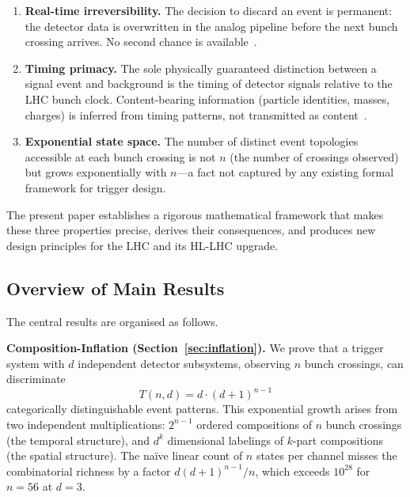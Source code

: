 \documentclass[twocolumn,10pt,a4paper]{article}
\theoremstyle{thmstyle}
\theoremstyle{definition}
\theoremstyle{remark}
\begin{document}
\begin{enumerate}[leftmargin=1.5em,itemsep=0.2em]
\item \textbf{Real-time irreversibility.} The decision to discard an
event is permanent: the detector data is overwritten in the analog
pipeline before the next bunch crossing arrives. No second chance is
available~\citep{atlas_hlt2003,cms_trigger2002}.

\item \textbf{Timing primacy.} The sole physically guaranteed
distinction between a signal event and background is the timing of
detector signals relative to the LHC bunch clock. Content-bearing
information (particle identities, masses, charges) is inferred from
timing patterns, not transmitted as content~\citep{leo1994techniques}.

\item \textbf{Exponential state space.} The number of distinct event
topologies accessible at each bunch crossing is not $n$ (the number
of crossings observed) but grows exponentially with $n$---a fact
not captured by any existing formal framework for trigger design.
\end{enumerate}

The present paper establishes a rigorous mathematical framework that
makes these three properties precise, derives their consequences, and
produces new design principles for the LHC and its HL-LHC upgrade.

\subsection{Overview of Main Results}

The central results are organised as follows.

\textbf{Composition-Inflation (Section~\ref{sec:inflation}).}
We prove that a trigger system with $d$ independent detector
subsystems, observing $n$ bunch crossings, can discriminate
\begin{equation}
T(n,d) = d \cdot (d+1)^{n-1}
\end{equation}
categorically distinguishable event patterns. This exponential growth
arises from two independent multiplications: $2^{n-1}$ ordered
compositions of $n$ bunch crossings (the temporal structure), and $d^k$
dimensional labelings of $k$-part compositions (the spatial structure).
The na\"ive linear count of $n$ states per channel misses the
combinatorial richness by a factor $d(d+1)^{n-1}/n$, which exceeds
$10^{28}$ for $n = 56$ at $d = 3$.
\end{document}
